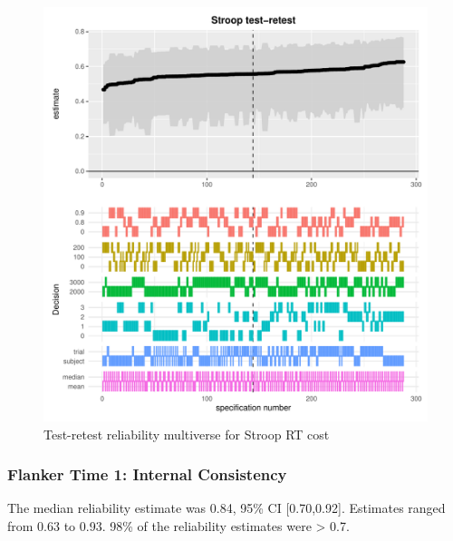 \documentclass[
  english,
  man,floatsintext]{apa6}
\begin{document}
\begin{figure}
\centering
\includegraphics{Reliability_Multiverse_files/figure-latex/unnamed-chunk-7-1.pdf}
\caption{\label{fig:unnamed-chunk-7}Test-retest reliability multiverse for Stroop RT cost}
\end{figure}

\newpage

\hypertarget{flanker-time-1-internal-consistency}{%
\subsubsection{Flanker Time 1: Internal Consistency}\label{flanker-time-1-internal-consistency}}

The median reliability estimate was 0.84, 95\% CI {[}0.70,0.92{]}. Estimates ranged from 0.63 to 0.93. 98\% of the reliability estimates were \textgreater{} 0.7.
\end{document}

